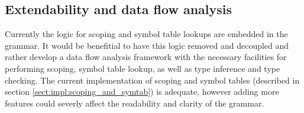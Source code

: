 \subsection{Extendability and data flow analysis}
\label{sect:discussion:ast:extend}
Currently the logic for scoping and symbol table lookups are embedded in the
grammar. It would be benefitial to have this logic removed and decoupled and
rather develop a data flow analysis framework with the necessary facilities for
performing scoping, symbol table lookup, as well as type inference and type
checking. The current implementation of scoping and symbol tables (described in
section \ref{sect:impl:scoping_and_symtab}) is adequate, however adding more
features could severly affect the readability and clarity of the grammar.
